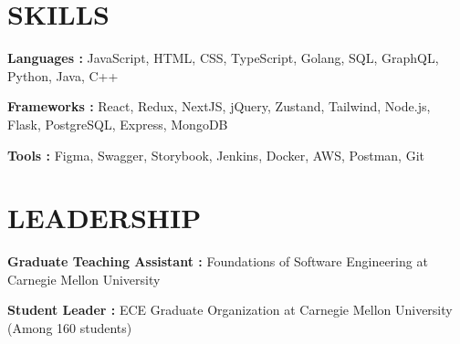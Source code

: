 \documentclass[letterpaper]{article}
\newcommand{\shortSection}[1]{
    \vspace{-6pt}
    \section{#1}
}
\newcommand*{\skill}[2]{
  \textbf{#1 : }#2 \\
  \vspace{1pt}
}
\begin{document}
\shortSection{SKILLS}
\skill {Languages\hspace{8pt}}{JavaScript, HTML, CSS, TypeScript, Golang, SQL, GraphQL, Python, Java, C++}
\skill {Frameworks}{React, Redux, NextJS, jQuery, Zustand, Tailwind, Node.js, Flask, PostgreSQL, Express, MongoDB}
\skill {Tools\hspace{34pt}}{Figma, Swagger, Storybook, Jenkins, Docker, AWS, Postman, Git}



\shortSection{LEADERSHIP}
\skill{Graduate Teaching Assistant}{Foundations of Software Engineering at Carnegie Mellon University}
\skill{Student Leader}{ECE Graduate Organization at Carnegie Mellon University (Among 160 students)}
\end{document}
